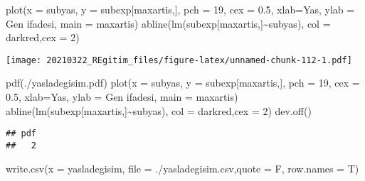 \documentclass[
]{book}
\newenvironment{Shaded}{\begin{snugshade}}{\end{snugshade}}
\newcommand{\AttributeTok}[1]{\textcolor[rgb]{0.77,0.63,0.00}{#1}}
\newcommand{\DecValTok}[1]{\textcolor[rgb]{0.00,0.00,0.81}{#1}}
\newcommand{\FloatTok}[1]{\textcolor[rgb]{0.00,0.00,0.81}{#1}}
\newcommand{\FunctionTok}[1]{\textcolor[rgb]{0.00,0.00,0.00}{#1}}
\newcommand{\NormalTok}[1]{#1}
\newcommand{\SpecialCharTok}[1]{\textcolor[rgb]{0.00,0.00,0.00}{#1}}
\newcommand{\StringTok}[1]{\textcolor[rgb]{0.31,0.60,0.02}{#1}}
\begin{document}
\begin{Shaded}
\begin{Highlighting}[]
\FunctionTok{plot}\NormalTok{(}\AttributeTok{x =}\NormalTok{ subyas, }\AttributeTok{y =}\NormalTok{ subexp[maxartis,], }\AttributeTok{pch =} \DecValTok{19}\NormalTok{, }\AttributeTok{cex =} \FloatTok{0.5}\NormalTok{, }\AttributeTok{xlab=}\StringTok{\textquotesingle{}Yas\textquotesingle{}}\NormalTok{,}
     \AttributeTok{ylab =} \StringTok{\textquotesingle{}Gen ifadesi\textquotesingle{}}\NormalTok{, }\AttributeTok{main =}\NormalTok{ maxartis)}
\FunctionTok{abline}\NormalTok{(}\FunctionTok{lm}\NormalTok{(subexp[maxartis,]}\SpecialCharTok{\textasciitilde{}}\NormalTok{subyas), }\AttributeTok{col =} \StringTok{\textquotesingle{}darkred\textquotesingle{}}\NormalTok{,}\AttributeTok{cex =} \DecValTok{2}\NormalTok{)}
\end{Highlighting}
\end{Shaded}

\texttt{[image: 20210322\_REgitim\_files/figure-latex/unnamed-chunk-112-1.pdf]}

\begin{Shaded}
\begin{Highlighting}[]
\FunctionTok{pdf}\NormalTok{(}\StringTok{\textquotesingle{}./yasladegisim.pdf\textquotesingle{}}\NormalTok{)}
\FunctionTok{plot}\NormalTok{(}\AttributeTok{x =}\NormalTok{ subyas, }\AttributeTok{y =}\NormalTok{ subexp[maxartis,], }\AttributeTok{pch =} \DecValTok{19}\NormalTok{, }\AttributeTok{cex =} \FloatTok{0.5}\NormalTok{, }\AttributeTok{xlab=}\StringTok{\textquotesingle{}Yas\textquotesingle{}}\NormalTok{,}
     \AttributeTok{ylab =} \StringTok{\textquotesingle{}Gen ifadesi\textquotesingle{}}\NormalTok{, }\AttributeTok{main =}\NormalTok{ maxartis)}
\FunctionTok{abline}\NormalTok{(}\FunctionTok{lm}\NormalTok{(subexp[maxartis,]}\SpecialCharTok{\textasciitilde{}}\NormalTok{subyas), }\AttributeTok{col =} \StringTok{\textquotesingle{}darkred\textquotesingle{}}\NormalTok{,}\AttributeTok{cex =} \DecValTok{2}\NormalTok{)}
\FunctionTok{dev.off}\NormalTok{()}
\end{Highlighting}
\end{Shaded}

\begin{verbatim}
## pdf 
##   2
\end{verbatim}

\begin{Shaded}
\begin{Highlighting}[]
\FunctionTok{write.csv}\NormalTok{(}\AttributeTok{x =}\NormalTok{ yasladegisim, }\AttributeTok{file =} \StringTok{\textquotesingle{}./yasladegisim.csv\textquotesingle{}}\NormalTok{,}\AttributeTok{quote =}\NormalTok{ F,}
          \AttributeTok{row.names =}\NormalTok{ T)}
\end{Highlighting}
\end{Shaded}
\end{document}

